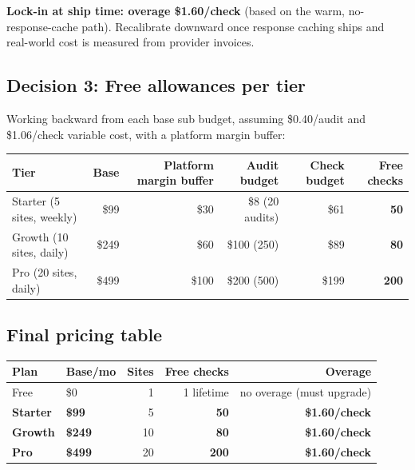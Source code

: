 \documentclass[11pt,letterpaper]{article}
\begin{document}
\textbf{Lock-in at ship time: overage \$1.60/check} (based on the warm,
no-response-cache path). Recalibrate downward once response caching ships
and real-world cost is measured from provider invoices.

\subsection{Decision 3: Free allowances per tier}

Working backward from each base sub budget, assuming \$0.40/audit and
\$1.06/check variable cost, with a platform margin buffer:

\begin{center}
\begin{tabular}{@{}lrrrrr@{}}
\toprule
\textbf{Tier} & \textbf{Base} & \textbf{Platform margin buffer} & \textbf{Audit budget} & \textbf{Check budget} & \textbf{Free checks} \\
\midrule
Starter (5 sites, weekly) & \$99  & \$30  & \$8 (20 audits) & \$61  & \textbf{50} \\
Growth  (10 sites, daily) & \$249 & \$60  & \$100 (250)     & \$89  & \textbf{80} \\
Pro     (20 sites, daily) & \$499 & \$100 & \$200 (500)     & \$199 & \textbf{200} \\
\bottomrule
\end{tabular}
\end{center}

\subsection{Final pricing table}

\begin{center}
\begin{tabular}{@{}llrrr@{}}
\toprule
\textbf{Plan} & \textbf{Base/mo} & \textbf{Sites} & \textbf{Free checks} & \textbf{Overage} \\
\midrule
Free    & \$0   & 1  & 1 lifetime & no overage (must upgrade) \\
\textbf{Starter} & \textbf{\$99}  & 5  & \textbf{50}  & \textbf{\$1.60/check} \\
\textbf{Growth}  & \textbf{\$249} & 10 & \textbf{80}  & \textbf{\$1.60/check} \\
\textbf{Pro}     & \textbf{\$499} & 20 & \textbf{200} & \textbf{\$1.60/check} \\
\bottomrule
\end{tabular}
\end{center}
\end{document}
